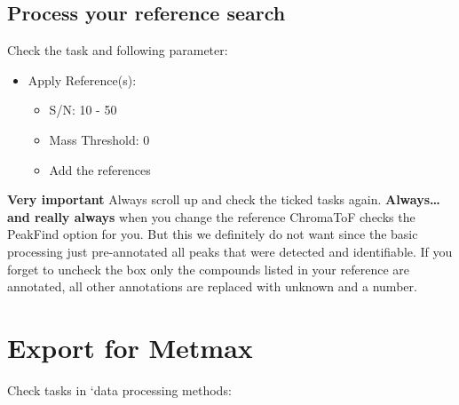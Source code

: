 \documentclass[]{book}
\providecommand{\tightlist}{%
  \setlength{\itemsep}{0pt}\setlength{\parskip}{0pt}}
\theoremstyle{definition}
\theoremstyle{definition}
\theoremstyle{definition}
\theoremstyle{remark}
\begin{document}
\subsection{Process your reference
search}\label{process-your-reference-search}

Check the task and following parameter:

\begin{itemize}
\item
  Apply Reference(s):

  \begin{itemize}
  \tightlist
  \item
    S/N: 10 - 50
  \item
    Mass Threshold: 0
  \item
    Add the references
  \end{itemize}
\end{itemize}

\textbf{Very important} Always scroll up and check the ticked tasks
again. \textbf{Always\ldots{} and really always} when you change the
reference ChromaToF checks the PeakFind option for you. But this we
definitely do not want since the basic processing just pre-annotated all
peaks that were detected and identifiable. If you forget to uncheck the
box only the compounds listed in your reference are annotated, all other
annotations are replaced with unknown and a number.

\section{Export for Metmax}\label{export-for-metmax}

Check tasks in `data processing methods:
\end{document}
